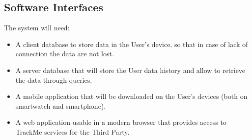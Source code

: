 \subsection{Software Interfaces}
The system will need:

\begin{itemize}
    \item A client database to store data in the User’s device, so that in case of lack of connection the data are not lost.
    \item A server database that will store the User data history and allow to retrieve the data through queries.
    \item A mobile application that will be downloaded on the User’s devices (both on smartwatch and smartphone).
    \item A web application usable in a modern browser that provides access to TrackMe services for the Third Party.
\end{itemize}


	
